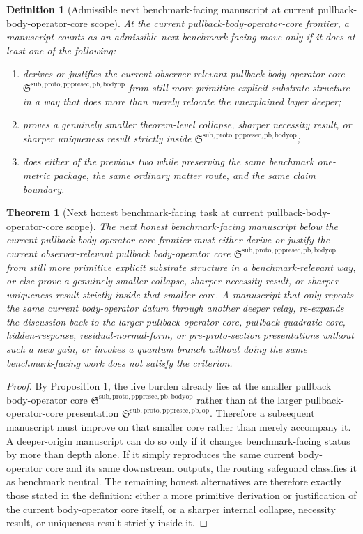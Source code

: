 \documentclass[11pt]{article}
\newcommand{\PullbackOperatorCore}{\mathfrak S^{\mathrm{sub,proto,pppresec,pb,op}}}
\newcommand{\PullbackBodyOperatorCore}{\mathfrak S^{\mathrm{sub,proto,pppresec,pb,bodyop}}}
\newtheorem{definition}{Definition}
\newtheorem{theorem}{Theorem}
\begin{document}
\begin{definition}[Admissible next benchmark-facing manuscript at current pullback-body-operator-core scope]
At the current pullback-body-operator-core frontier, a manuscript counts as an admissible next benchmark-facing move only if it does at least one of the following:
\begin{enumerate}
    \item derives or justifies the current observer-relevant pullback body-operator core \(\PullbackBodyOperatorCore\) from still more primitive explicit substrate structure in a way that does more than merely relocate the unexplained layer deeper;
    \item proves a genuinely smaller theorem-level collapse, sharper necessity result, or sharper uniqueness result strictly inside \(\PullbackBodyOperatorCore\);
    \item does either of the previous two while preserving the same benchmark one-metric package, the same ordinary matter route, and the same claim boundary.
\end{enumerate}
\end{definition}

\begin{theorem}[Next honest benchmark-facing task at current pullback-body-operator-core scope]
The next honest benchmark-facing manuscript below the current pullback-body-operator-core frontier must either derive or justify the current observer-relevant pullback body-operator core \(\PullbackBodyOperatorCore\) from still more primitive explicit substrate structure in a benchmark-relevant way, or else prove a genuinely smaller collapse, sharper necessity result, or sharper uniqueness result strictly inside that smaller core. A manuscript that only repeats the same current body-operator datum through another deeper relay, re-expands the discussion back to the larger pullback-operator-core, pullback-quadratic-core, hidden-response, residual-normal-form, or pre-proto-section presentations without such a new gain, or invokes a quantum branch without doing the same benchmark-facing work does not satisfy the criterion.
\end{theorem}

\begin{proof}
By Proposition 1, the live burden already lies at the smaller pullback body-operator core \(\PullbackBodyOperatorCore\) rather than at the larger pullback-operator-core presentation \(\PullbackOperatorCore\). Therefore a subsequent manuscript must improve on that smaller core rather than merely accompany it. A deeper-origin manuscript can do so only if it changes benchmark-facing status by more than depth alone. If it simply reproduces the same current body-operator core and its same downstream outputs, the routing safeguard classifies it as benchmark neutral. The remaining honest alternatives are therefore exactly those stated in the definition: either a more primitive derivation or justification of the current body-operator core itself, or a sharper internal collapse, necessity result, or uniqueness result strictly inside it.
\end{proof}
\end{document}
